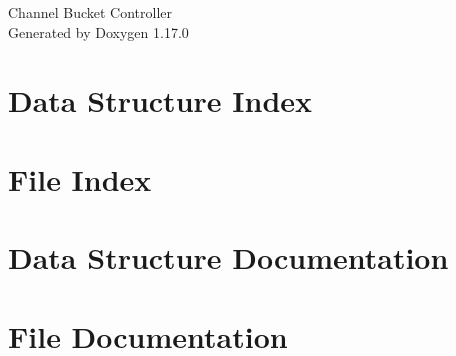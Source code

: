 \documentclass[twoside]{book}
\newcommand{\+}{\discretionary{\mbox{\scriptsize$\hookleftarrow$}}{}{}}
\newcommand{\clearemptydoublepage}{%
    \newpage{\pagestyle{empty}\cleardoublepage}%
  }
\begin{document}
  \raggedbottom
    \hypersetup{pageanchor=false,
                bookmarksnumbered=true,
                pdfencoding=unicode
               }
  \begin{titlepage}
  \vspace*{7cm}
  \begin{center}%
  {\Large Channel Bucket Controller}\\
  \vspace*{1cm}
  {\large Generated by Doxygen 1.17.0}\\
  \end{center}
  \end{titlepage}
  \clearemptydoublepage
  \tableofcontents
  \clearemptydoublepage
  \hypersetup{pageanchor=true}
\chapter{Data Structure Index}

\chapter{File Index}

\chapter{Data Structure Documentation}


\chapter{File Documentation}













  \backmatter
  \newpage
  \clearemptydoublepage
  \printindex
\end{document}
